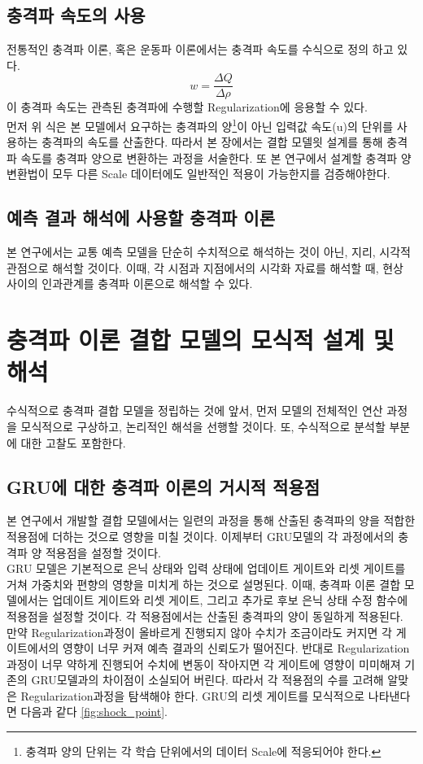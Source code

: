 \documentclass[11pt]{report}
\begin{document}
\subsection{충격파 속도의 사용}
전통적인 충격파 이론, 혹은 운동파 이론에서는 충격파 속도를 수식으로 정의 하고 있다.
\[
w = \frac{\Delta Q}{\Delta \rho}
\]
이 충격파 속도는 관측된 충격파에 수행할 Regularization에 응용할 수 있다. \\
\indent 먼저 위 식은 본 모델에서 요구하는 충격파의 양\footnote{충격파 양의 단위는 각 학습 단위에서의 데이터 Scale에 적응되어야 한다.}이 아닌 입력값 속도(u)의 단위를 사용하는 충격파의 속도를 산출한다. 
따라서 본 장에서는 결합 모델읫 설계를 통해 충격파 속도를 충격파 양으로 변환하는 과정을 서술한다. 
또 본 연구에서 설계할 충격파 양 변환법이 모두 다른 Scale 데이터에도 일반적인 적용이 가능한지를 검증해야한다. 
\subsection{예측 결과 해석에 사용할 충격파 이론}
본 연구에서는 교통 예측 모델을 단순히 수치적으로 해석하는 것이 아닌, 지리, 시각적 관점으로 해석할 것이다. 
이때, 각 시점과 지점에서의 시각화 자료를 해석할 때, 현상 사이의 인과관계를 충격파 이론으로 해석할 수 있다. 

\section{충격파 이론 결합 모델의 모식적 설계 및 해석}
수식적으로 충격파 결합 모델을 정립하는 것에 앞서, 먼저 모델의 전체적인 연산 과정을 모식적으로 구상하고, 논리적인 해석을 선행할 것이다. 
또, 수식적으로 분석할 부분에 대한 고찰도 포함한다.

\subsection{GRU에 대한 충격파 이론의 거시적 적용점}
본 연구에서 개발할 결합 모델에서는 일련의 과정을 통해 산출된 충격파의 양을 적합한 적용점에 더하는 것으로 영향을 미칠 것이다. 이제부터 GRU모델의 각 과정에서의 충격파 양 적용점을 설정할 것이다. \\
\indent GRU 모델은 기본적으로 은닉 상태와 입력 상태에 업데이트 게이트와 리셋 게이트를 거쳐 가중치와 편향의 영향을 미치게 하는 것으로 설명된다. 
이때, 충격파 이론 결합 모델에서는 업데이트 게이트와 리셋 게이트, 그리고 추가로 후보 은닉 상태 수정 함수에 적용점을 설정할 것이다. 
각 적용점에서는 산출된 충격파의 양이 동일하게 적용된다. 
만약 Regularization과정이 올바르게 진행되지 않아 수치가 조금이라도 커지면 각 게이트에서의 영향이 너무 커져 예측 결과의 신뢰도가 떨어진다. 
반대로 Regularization과정이 너무 약하게 진행되어 수치에 변동이 작아지면 각 게이트에 영향이 미미해져 기존의 GRU모델과의 차이점이 소실되어 버린다. 
따라서 각 적용점의 수를 고려해 알맞은 Regularization과정을 탐색해야 한다. 
GRU의 리셋 게이트를 모식적으로 나타낸다면 다음과 같다 \autoref{fig:shock_point}. 
\end{document}
